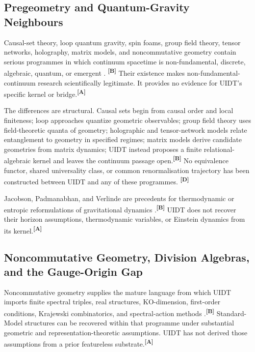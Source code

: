 \documentclass[12pt,a4paper,twoside]{article}
\theoremstyle{plain}
\theoremstyle{definition}
\theoremstyle{remark}
\newcommand{\catmark}[1]{\textsuperscript{\textsf{\textbf{[#1]}}}}
\begin{document}
\subsection{Pregeometry and Quantum-Gravity Neighbours}
\label{subsec:ctx-qg-neighbours}

Causal-set theory, loop quantum gravity, spin foams, group field theory, tensor
networks, holography, matrix models, and noncommutative geometry contain serious
programmes in which continuum spacetime is non-fundamental, discrete,
algebraic, quantum, or emergent
\cite{bombelli1987,sorkin2003,rovelli2011,gielen2016,swingle2012,vanraamsdonk2010,ikkt1997,steinacker2010}.
\catmark{B} Their existence makes non-fundamental-continuum research
scientifically legitimate. It provides no evidence for UIDT's specific kernel
or bridge.\catmark{A}

The differences are structural. Causal sets begin from causal order and local
finiteness; loop approaches quantize geometric observables; group field theory
uses field-theoretic quanta of geometry; holographic and tensor-network models
relate entanglement to geometry in specified regimes; matrix models derive
candidate geometries from matrix dynamics; UIDT instead proposes a finite
relational-algebraic kernel and leaves the continuum passage open.\catmark{B}
No equivalence functor, shared universality class, or common renormalisation
trajectory has been constructed between UIDT and any of these programmes.
\catmark{D}

Jacobson, Padmanabhan, and Verlinde are precedents for thermodynamic or entropic
reformulations of gravitational dynamics
\cite{jacobson1995,padmanabhan2010,verlinde2011}.\catmark{B} UIDT does not
recover their horizon assumptions, thermodynamic variables, or Einstein
dynamics from its kernel.\catmark{A}

\subsection{Noncommutative Geometry, Division Algebras, and the Gauge-Origin Gap}
\label{subsec:ctx-gauge-origin}

Noncommutative geometry supplies the mature language from which UIDT imports
finite spectral triples, real structures, KO-dimension, first-order
conditions, Krajewski combinatorics, and spectral-action methods
\cite{connes2006,cc2008,vansuijlekom2019}.\catmark{B} Standard-Model
structures can be recovered within that programme under substantial geometric
and representation-theoretic assumptions. UIDT has not derived those
assumptions from a prior featureless substrate.\catmark{A}
\end{document}
